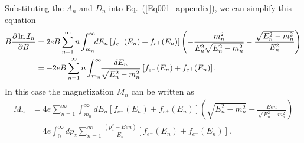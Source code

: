 \documentclass[sn-mathphys,Numbered]{sn-jnl}
\begin{document}
Substituting the $A_n$ and $D_n$ into Eq.~(\ref{Eq001_appendix}), we can simplify this equation 
\begin{align}
B\frac{\partial\ln\mathcal{I}_n}{\partial B}
&=2eB\sum_{n=1}^\infty n\int_{m_n}^\infty\!\!dE_n \left[f_{e^-}(E_n)+f_{e^+}(E_n)\right]\left(-\frac{m^2_n}{E^2_{n}\sqrt{E^2_n-m^2_n}}-\frac{\sqrt{E^2_n-m^2_n}}{E^2_{n}}\right)\notag\\
&=-2eB\sum_{n=1}^\infty n\int_{m_n}^\infty\!\!\frac{dE_n}{\sqrt{E^2_n-m^2_n}} \left[f_{e^-}(E_n)+f_{e^+}(E_n)\right].
\end{align}
In this case the magnetization $M_n$ can be written as
\begin{align}
M_n&=4e\sum_{n=1}^\infty \int_{m_n}^\infty\!\!dE_n\left[f_{e^-}(E_n)+f_{e^+}(E_n)\right]\left({\sqrt{E^2_n-m^2_n}}-\frac{Ben}{\sqrt{E^2_n-m^2_n}}\right)\\
&=4e \int_{0}^\infty\!\!dp_z\sum_{n=1}^\infty\frac{(p_z^2-Ben)}{E_n}\left[f_{e^-}(E_n)+f_{e^+}(E_n)\right].
\end{align}

\end{document}
